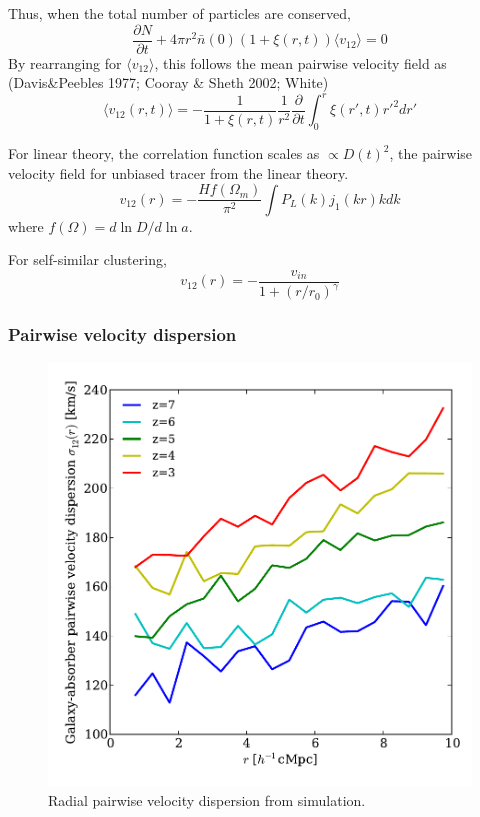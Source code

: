 \documentclass[useAMS,usenatbib,twocolumn]{mn2e}
\begin{document}
Thus, when the total number of particles are conserved,
\begin{equation}
\frac{\partial N}{\partial t}+
4\pi r^2\bar{n}(0)(1+\xi(r,t))\langle v_{12}\rangle=0
\end{equation}
By rearranging for $\langle v_{12}\rangle$, this follows the mean pairwise 
velocity field as (Davis\&Peebles 1977; Cooray \& Sheth 2002; White)
\begin{equation}
\langle v_{12}(r,t)\rangle=-\frac{1}{1+\xi(r,t)}\frac{1}{r^2}
\frac{\partial}{\partial t}\int_0^r\xi(r',t)r'^2dr'
\end{equation}

For linear theory, the correlation function scales as $\propto D(t)^2$,
the pairwise velocity field for unbiased tracer from the linear theory.
\begin{equation}
v_{12}(r)=-\frac{Hf(\Omega_m)}{\pi^2}\int P_L(k)j_1(kr) kdk
\end{equation}
where $f(\Omega)=d\ln D/d\ln a$.

For self-similar clustering,
\begin{equation}
v_{12}(r)=-\frac{v_{in}}{1+(r/r_0)^\gamma}
\end{equation}


\subsubsection{Pairwise velocity dispersion}

\begin{figure}
 \begin{center}
  \includegraphics[angle=0,width=\columnwidth]{figure/s12_L40P256G256R0_Gamma12_SST.pdf}
  \caption{Radial pairwise velocity dispersion from simulation.}\label{s12}
 \end{center}
\end{figure}
\end{document}
